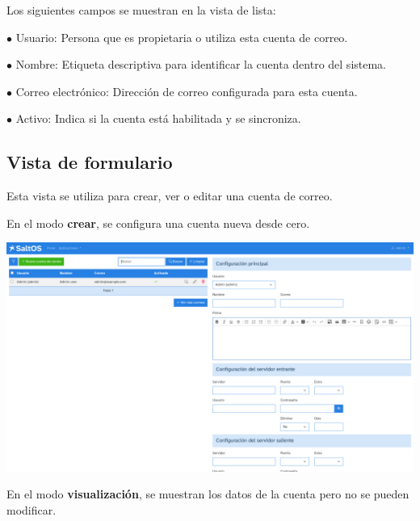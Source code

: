 \documentclass[a4paper]{article}
\begin{document}
Los siguientes campos se muestran en la vista de lista:

\begin{compactitem}
\item[\color{myblue}$\bullet$] Usuario: Persona que es propietaria o utiliza esta cuenta de correo.
\item[\color{myblue}$\bullet$] Nombre: Etiqueta descriptiva para identificar la cuenta dentro del sistema.
\item[\color{myblue}$\bullet$] Correo electrónico: Dirección de correo configurada para esta cuenta.
\item[\color{myblue}$\bullet$] Activo: Indica si la cuenta está habilitada y se sincroniza.
\end{compactitem}

\hypertarget{toc99}{}
\subsection{Vista de formulario}

Esta vista se utiliza para crear, ver o editar una cuenta de correo.

En el modo \textbf{crear}, se configura una cuenta nueva desde cero.

\begin{center}\includegraphics[width=1\textwidth]{../ujest/snaps/test-screenshots-js-screenshots-emails-emails-accounts-create-es-es-1-snap.png}\end{center}

En el modo \textbf{visualización}, se muestran los datos de la cuenta pero no se pueden modificar.
\end{document}
